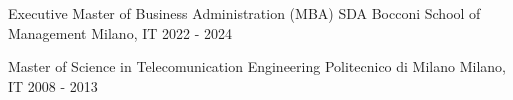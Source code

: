 
\begin{cventries}
  \cventrynodata
    {Executive Master of Business Administration (MBA)} %
    {SDA Bocconi School of Management} %
    {Milano, IT} %
    {2022 - 2024} %

  \cventrynodata
    {Master of Science in Telecomunication Engineering} %
    {Politecnico di Milano} %
    {Milano, IT} %
    {2008 - 2013} %

\end{cventries}
